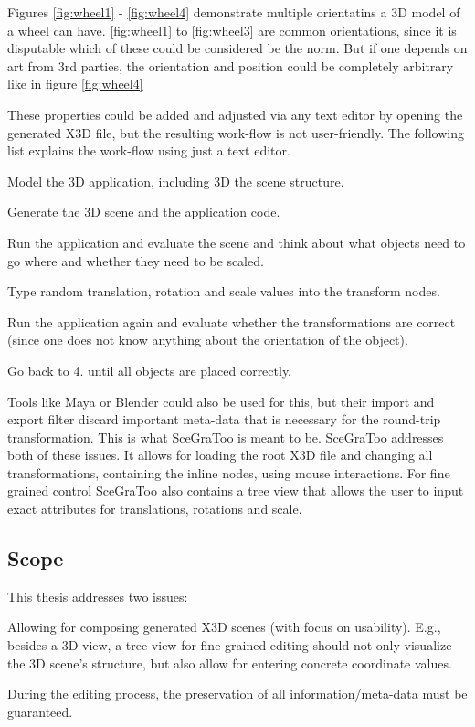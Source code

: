 Figures \ref{fig:wheel1} - \ref{fig:wheel4} demonstrate multiple orientatins a \gls{3D} model of a wheel can have. \ref{fig:wheel1} to \ref{fig:wheel3} are common
orientations, since it is disputable which of these could be considered be the
norm. But if one depends on art from 3rd parties, the orientation and position
could be completely arbitrary like in figure \ref{fig:wheel4}

These properties could be added and adjusted via any text editor by opening the
generated \gls{X3D} file, but the resulting work-flow is not user-friendly. The
following list explains the work-flow using just a text editor.

\begin{enumerate*}
  \item Model the \gls{3D} application, including \gls{3D} the scene structure.
  \item Generate the \gls{3D} scene and the application code.
  \item Run the application and evaluate the scene and think about what objects need to go where and whether they need to be scaled.
  \item Type random translation, rotation and scale values into the transform nodes.
  \item Run the application again and evaluate whether the transformations are correct (since one does not know anything about the orientation of the object).
  \item Go back to 4. until all objects are placed correctly.
\end{enumerate*}

Tools like Maya or Blender could also be used for this, but their import
and export filter discard important meta-data that is necessary for the
round-trip transformation. This is what \gls{SceGraToo} is meant to be. \gls{SceGraToo} addresses both of these issues. It allows for loading the root \gls{X3D} file and changing all transformations, containing the inline nodes,
using mouse interactions. For fine grained control \gls{SceGraToo} also
contains a tree view that allows the user to input exact attributes for
translations, rotations and scale.

\subsection{Scope}\label{scope}

This thesis addresses two issues:

\begin{enumerate*}
  \item Allowing for composing generated \gls{X3D} scenes (with focus on usability). E.g., besides a \gls{3D} view, a tree view for fine grained editing should not only visualize the \gls{3D} scene's structure, but also allow for entering concrete coordinate values.
  \item During the editing process, the preservation of all information/meta-data must be guaranteed.
\end{enumerate*}
